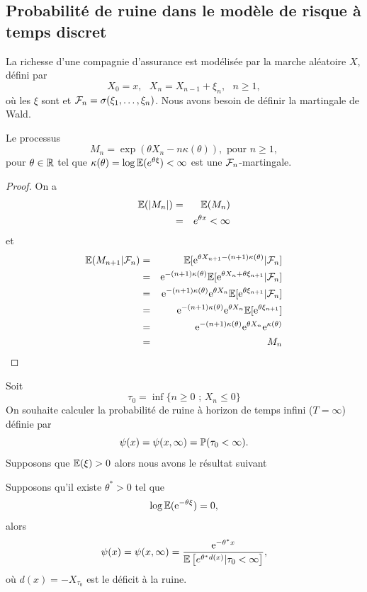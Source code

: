 \subsection{Probabilité de ruine dans le modèle de risque à temps discret}
La richesse d'une compagnie d'assurance est modélisée par la marche aléatoire $X$, défini par 
$$
X_0 = x,\text{ }X_n = X_{n-1} +\xi_n,\text{ }n\geq 1, 
$$
où les $\xi$ sont \iid et $\mathcal{F}_n = \sigma(\xi_1,\ldots, \xi_n)$. Nous avons besoin de définir la martingale de Wald. 
\begin{prop}
Le processus  
$$
M_n = \exp(\theta X_n - n\kappa(\theta)),\text{ pour }n\geq1,
$$
pour $\theta\in \mathbb{R}$ tel que $\kappa(\theta) = \log\mathbb{E}(e^{\theta\xi})<\infty$ est une $\mathcal{F}_n$-martingale.
\end{prop}
\begin{proof}
On a 
\begin{eqnarray*}
\mathbb{E}(|M_{n}|) &=& \mathbb{E}(M_{n})\\
&=& e^{\theta x}<\infty
\end{eqnarray*}
et
\begin{eqnarray*}
\mathbb{E}(M_{n+1}|\mathcal{F}_n) &=& \mathbb{E}[\mathrm{e}^{\theta X_{n+1} - (n+1)\kappa(\theta)}|\mathcal{F}_n]\\
&=& \mathrm{e}^{-(n+1)\kappa(\theta)}\mathbb{E}[\mathrm{e}^{\theta X_{n} +\theta\xi_{n+1} }|\mathcal{F}_n]\\
&=& \mathrm{e}^{-(n+1)\kappa(\theta)}\mathrm{e}^{\theta X_{n}}\mathbb{E}[ \mathrm{e}^{\theta\xi_{n+1} }|\mathcal{F}_n]\\
&=& \mathrm{e}^{-(n+1)\kappa(\theta)}\mathrm{e}^{\theta X_{n}}\mathbb{E}[ \mathrm{e}^{\theta\xi_{n+1} }]\\
&=& \mathrm{e}^{-(n+1)\kappa(\theta)}\mathrm{e}^{\theta X_{n}}\mathrm{e}^{\kappa(\theta)}\\
&=& M_n
\end{eqnarray*}
\end{proof}
Soit 
$$
\tau_0=\inf\{n\geq0\text{ ; }X_n \leq0\} 
$$
On souhaite calculer la probabilité de ruine à horizon de temps infini ($T = \infty$) définie par 
$$
\psi(x) = \psi(x,\infty) = \mathbb{P}(\tau_0 <\infty).
$$
Supposons que $\mathbb{E}(\xi)>0$ alors nous avons le résultat suivant 
\begin{prop}
Supposons qu'il existe $\theta^{\ast}>0$ tel que
$$
\log\mathbb{E}(\mathrm{e}^{-\theta\xi}) = 0,
$$
alors
$$
\psi(x) = \psi(x,\infty) = \frac{\mathrm{e}^{-\theta^\ast x}}{\mathbb{E}\left[e^{\theta^\ast d(x)}|\tau_0 <\infty\right]},
$$
où $d(x) = - X_{\tau_0}$ est le déficit à la ruine.
\end{prop}

